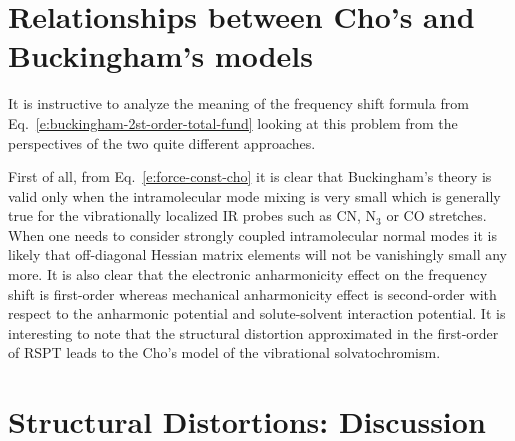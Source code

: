 \documentclass[a4paper,titlepage,twoside,fleqn,12pt]{book}
\begin{document}
\begin{refsection}
\section{Relationships between Cho's and Buckingham's models}

It is instructive to analyze the meaning of the frequency shift
formula from Eq.~\eqref{e:buckingham-2st-order-total-fund}
looking at this problem from the perspectives of the two quite different approaches.

First of all, from Eq.~\eqref{e:force-const-cho} it is clear 
that Buckingham's theory is valid only
when the intramolecular mode mixing is very small which
is generally true for the vibrationally localized IR probes
such as CN, N$_3$ or CO stretches. When one needs to consider
strongly coupled intramolecular normal modes it is likely
that off\hyp{}diagonal Hessian matrix elements will not be vanishingly
small any more. It is also
clear that the electronic anharmonicity effect on the frequency 
shift is first\hyp{}order
whereas mechanical anharmonicity effect is second\hyp{}order 
with respect to the anharmonic potential and solute\hyp{}solvent
interaction potential. It is interesting to note 
that the structural distortion approximated
in the first\hyp{}order of RSPT leads to the Cho's model of the vibrational
solvatochromism. 

\section{Structural Distortions: Discussion \label{s:str-dist-general-discussion}}


\end{refsection}
\end{document}
